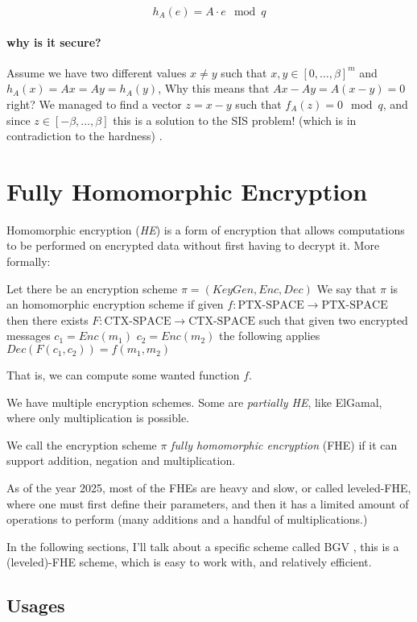 $$ h_A(e) = A\cdot e \mod q$$

\paragraph{\bf why is it secure?}
Assume we have two different values $x\neq y$ such that $x,y\in [0,\dots,\beta]^m$ and $h_A(x)=Ax=Ay=h_A(y)$, 
Why this means that $Ax-Ay=A(x-y)=0$ right? We managed to find a vector $z=x-y$ such that $f_A(z)=0 \mod q$, and since $z\in[-\beta,\dots,\beta]$ this is a solution to the SIS problem! (which is in contradiction to the hardness) .


\section{Fully Homomorphic Encryption}
Homomorphic encryption (\emph{HE}) is a form of encryption that allows 
computations to be performed on encrypted data without first having to decrypt it.
More formally:
\begin{definition}[HE]
 Let there be an encryption scheme $\pi = (KeyGen,Enc, Dec)$
 We say that $\pi$ is an homomorphic encryption scheme if
 given $f:\text{PTX-SPACE}\to \text{PTX-SPACE}$ then there
 exists $F:\text{CTX-SPACE} \to \text{CTX-SPACE}$ such that
 given two encrypted messages $c_1=Enc(m_1)$ $c_2=Enc(m_2)$ the following
 applies
   $Dec(F(c_1,c_2))=f(m_1,m_2)$
\end{definition}

That is, we can compute some wanted function $f$.

We have multiple encryption schemes. Some are \emph{partially HE},
like ElGamal, where only multiplication is possible.
\begin{theorem}
 We call the encryption scheme $\pi$ \emph{fully homomorphic encryption} (FHE) if it 
 can support addition, negation and multiplication.
\end{theorem}

As of the year 2025, most of the FHEs are heavy and slow,
or called leveled-FHE, where one must first define their parameters, 
and then it has a limited amount of operations to perform (many additions and a 
handful of multiplications.)

In the following sections, I'll talk about a specific scheme called BGV \cite{BGV},
this is a (leveled)-FHE scheme, which is easy to work with, and relatively efficient.

\subsection{Usages}

